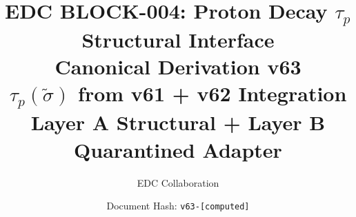 \documentclass[11pt,a4paper]{article}
\theoremstyle{definition}
\begin{document}

\title{%
  \textbf{EDC BLOCK-004: Proton Decay $\tau_p$ Structural Interface}\\[0.5em]
  \Large Canonical Derivation v63\\[0.3em]
  \large $\tau_p(\tilde{\sigma})$ from v61 + v62 Integration\\[0.3em]
  \normalsize Layer A Structural + Layer B Quarantined Adapter
}

\author{EDC Collaboration}
\date{Document Hash: \texttt{v63-[computed]}}

\maketitle
\end{document}
